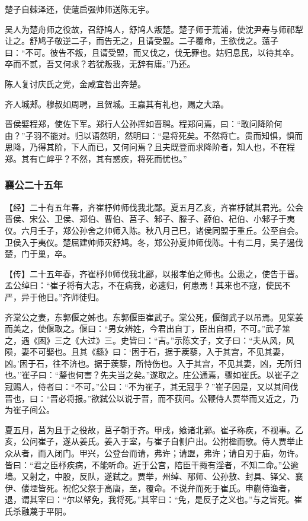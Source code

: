 \documentclass[]{article}
\begin{document}
楚子自棘泽还，使薳启强帅师送陈无宇。

吴人为楚舟师之役故，召舒鸠人，舒鸠人叛楚。楚子师于荒浦，使沈尹寿与师祁犁让之。舒鸠子敬逆二子，而告无之，且请受盟。二子覆命，王欲伐之。薳子曰：``不可。彼告不叛，且请受盟，而又伐之，伐无罪也。姑归息民，以待其卒。卒而不贰，吾又何求？若犹叛我，无辞有庸。''乃还。

陈人复讨庆氏之党，金咸宜咎出奔楚。

齐人城郏。穆叔如周聘，且贺城。王嘉其有礼也，赐之大路。

晋侯嬖程郑，使佐下军。郑行人公孙挥如晋聘。程郑问焉，曰：``敢问降阶何由？''子羽不能对。归以语然明，然明曰：``是将死矣。不然将亡。贵而知惧，惧而思降，乃得其阶，下人而已，又何问焉？且夫既登而求降阶者，知人也，不在程郑。其有亡衅乎？不然，其有惑疾，将死而忧也。''

\hypertarget{header-n2177}{%
\subsubsection{襄公二十五年}\label{header-n2177}}

【经】二十有五年春，齐崔杼帅师伐我北鄙。夏五月乙亥，齐崔杼弑其君光。公会晋侯、宋公、卫侯、郑伯、曹伯、莒子、邾子、滕子、薛伯、杞伯、小邾子于夷仪。六月壬子，郑公孙舍之帅师入陈。秋八月己巳，诸侯同盟于重丘。公至自会。卫侯入于夷仪。楚屈建帅师灭舒鸠。冬，郑公孙夏帅师伐陈。十有二月，吴子遏伐楚，门于巢，卒。

【传】二十五年春，齐崔杼帅师伐我北鄙，以报孝伯之师也。公患之，使告于晋。孟公绰曰：``崔子将有大志，不在病我，必速归，何患焉！其来也不寇，使民不严，异于他日。''齐师徒归。

齐棠公之妻，东郭偃之姊也。东郭偃臣崔武子。棠公死，偃御武子以吊焉。见棠姜而美之，使偃取之。偃曰：``男女辨姓，今君出自丁，臣出自桓，不可。''武子筮之，遇《困》三之《大过》三。史皆曰：``吉。''示陈文子，文子曰：``夫从风，风陨，妻不可娶也。且其《繇》曰：`困于石，据于蒺藜，入于其宫，不见其妻，凶。'困于石，往不济也。据于蒺藜，所恃伤也。入于其宫，不见其妻，凶，无所归也。''崔子曰：``嫠也何害？先夫当之矣。''遂取之。庄公通焉，骤如崔氏。以崔子之冠赐人，侍者曰：``不可。''公曰：``不为崔子，其无冠乎？''崔子因是，又以其间伐晋也，曰：``晋必将报。''欲弑公以说于晋，而不获间。公鞭侍人贾举而又近之，乃为崔子间公。

夏五月，莒为且于之役故，莒子朝于齐。甲戌，飨诸北郭。崔子称疾，不视事。乙亥，公问崔子，遂从姜氏。姜入于室，与崔子自侧户出。公拊楹而歌。侍人贾举止众从者，而入闭门。甲兴，公登台而请，弗许；请盟，弗许；请自刃于庙，勿许。皆曰：``君之臣杼疾病，不能听命。近于公宫，陪臣干掫有淫者，不知二命。''公逾墙。又射之，中股，反队，遂弑之。贾举，州绰、邴师、公孙敖、封具、铎父、襄伊、偻堙皆死。祝佗父祭于高唐，至，覆命。不说弁而死于崔氏。申蒯侍渔者，退，谓其宰曰：``尔以帑免，我将死。''其宰曰：``免，是反子之义也。''与之皆死。崔氏杀融蔑于平阴。
\end{document}
